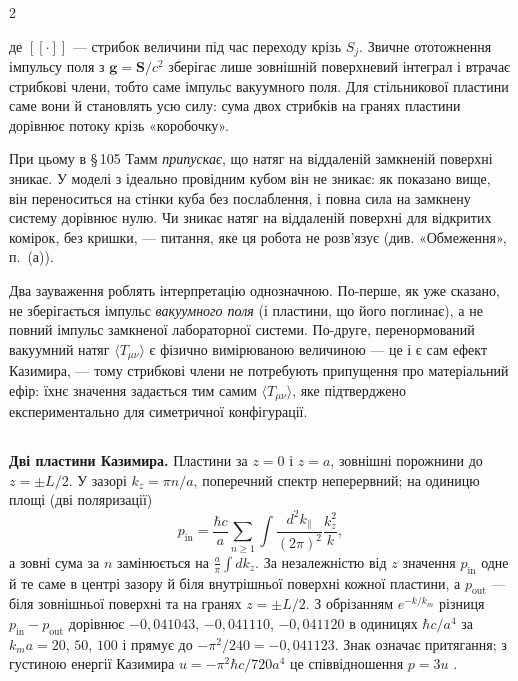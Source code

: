 \documentclass[twoside, 10pt]{article}
\def\myvspacebeforesubsection{-2.0mm}
\def\myvspaceaftersubsection{-2.5mm}
\begin{document}
\begin{multicols}{2}

де \([\![\cdot]\!]\) --- стрибок величини під час переходу крізь \(S_j\). Звичне ототожнення імпульсу поля з \(\mathbf{g}=\mathbf{S}/c^2\) зберігає лише зовнішній поверхневий інтеграл і втрачає стрибкові члени, тобто саме імпульс вакуумного поля. Для стільникової пластини саме вони й становлять усю силу: сума двох
стрибків на гранях пластини дорівнює потоку крізь «коробочку».

При цьому в \S\,105 Тамм \emph{припускає}, що натяг на віддаленій замкненій поверхні зникає. У моделі з ідеально провідним кубом він не зникає: як показано вище, він переноситься на стінки куба без послаблення, і повна сила на замкнену систему дорівнює нулю. Чи зникає натяг на віддаленій поверхні для відкритих комірок, без кришки, --- питання, яке ця робота не розв'язує (див. «Обмеження», п.~(а)).

Два зауваження роблять інтерпретацію однозначною. По-перше, як уже сказано, не зберігається імпульс \emph{вакуумного поля} (і пластини, що його поглинає), а не повний імпульс замкненої лабораторної системи.
По-друге, перенормований вакуумний натяг \(\langle T_{\mu\nu}\rangle\) є фізично вимірюваною
величиною --- це і є сам ефект Казимира, --- тому стрибкові члени не потребують припущення про
матеріальний ефір: їхнє значення задається тим самим \(\langle T_{\mu\nu}\rangle\), яке
підтверджено експериментально для симетричної конфігурації.

\vspace{\myvspacebeforesubsection}
\subsection*{}
\vspace{\myvspaceaftersubsection}


\textbf{Дві пластини Казимира.} Пластини за \(z=0\) і \(z=a\), зовнішні порожнини до
\(z=\pm L/2\). У зазорі \(k_z=\pi n/a\), поперечний спектр неперервний; на одиницю площі (дві
поляризації)
\[
p_{\text{in}}=\frac{\hbar c}{a}\sum_{n\ge1}\int\frac{d^2k_\parallel}{(2\pi)^2}\frac{k_z^2}{k},
\]
а зовні сума за \(n\) замінюється на \(\frac a\pi\int dk_z\). За незалежністю від \(z\) значення
\(p_{\text{in}}\) одне й те саме в центрі зазору й біля внутрішньої поверхні кожної пластини, а
\(p_{\text{out}}\) --- біля зовнішньої поверхні та на гранях \(z=\pm L/2\). З обрізанням
\(e^{-k/k_m}\) різниця \(p_{\text{in}}-p_{\text{out}}\) дорівнює \(-0{,}041043\), \(-0{,}041110\),
\(-0{,}041120\) в одиницях \(\hbar c/a^4\) за \(k_ma=20\), \(50\), \(100\) і прямує до
\(-\pi^2/240=-0{,}041123\). Знак означає притягання; з густиною енергії Казимира
\(u=-\pi^2\hbar c/720a^4\) це співвідношення \(p=3u\) \cite{BrownMaclay1969}.


\end{multicols}
\end{document}
